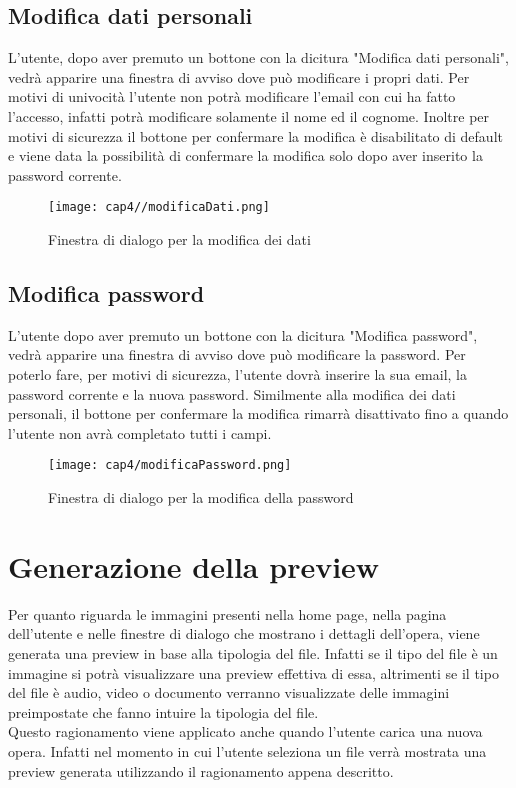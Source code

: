 \subsection{Modifica dati personali}
\label{subsec:modifica-dati-personali}

L'utente, dopo aver premuto un bottone con la dicitura "Modifica dati personali", vedrà apparire una finestra di avviso dove può modificare i propri dati. Per motivi di univocità l'utente non potrà modificare l'email con cui ha fatto l'accesso, infatti potrà modificare solamente il nome ed il cognome. Inoltre per motivi di sicurezza il bottone per confermare la modifica è disabilitato di default e viene data la possibilità di confermare la modifica solo dopo aver inserito la password corrente.
\begin{figure}[H]
	\begin{center}
		\texttt{[image: cap4//modificaDati.png]}
		\caption{Finestra di dialogo per la modifica dei dati}
	\end{center}
\end{figure}

\subsection{Modifica password}
\label{subsec:modifica-password}

L'utente dopo aver premuto un bottone con la dicitura "Modifica password", vedrà apparire una finestra di avviso dove può modificare la password. Per poterlo fare, per motivi di sicurezza, l'utente dovrà inserire la sua email, la password corrente e la nuova password. Similmente alla modifica dei dati personali, il bottone per confermare la modifica rimarrà disattivato fino a quando l'utente non avrà completato tutti i campi.
\begin{figure}[H]
	\begin{center}
		\texttt{[image: cap4/modificaPassword.png]}
		\caption{Finestra di dialogo per la modifica della password}
	\end{center}
\end{figure}

\section{Generazione della preview}
\label{sec:generazione-preview}

Per quanto riguarda le immagini presenti nella home page, nella pagina dell'utente e nelle finestre di dialogo che mostrano i dettagli dell'opera, viene generata una preview in base alla tipologia del file. Infatti se il tipo del file è un immagine si potrà visualizzare una preview effettiva di essa, altrimenti se il tipo del file è audio, video o documento verranno visualizzate delle immagini preimpostate che fanno intuire la tipologia del file.\\
Questo ragionamento viene applicato anche quando l'utente carica una nuova opera. Infatti nel momento in cui l'utente seleziona un file verrà mostrata una preview generata utilizzando il ragionamento appena descritto.
